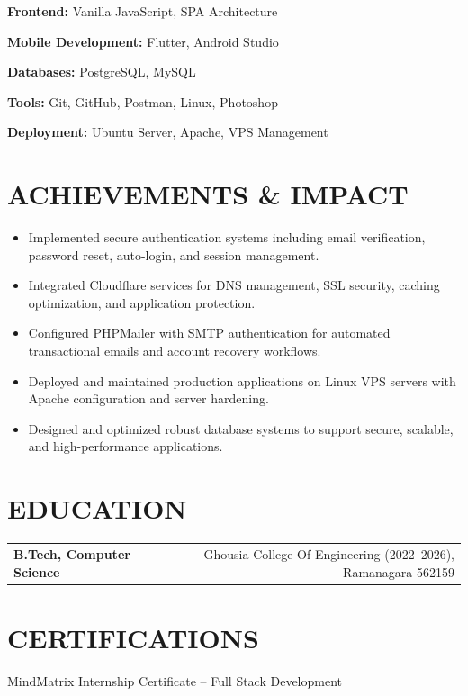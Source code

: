\documentclass[10pt,a4paper]{article}
\begin{document}
\textbf{Frontend:} Vanilla JavaScript, SPA Architecture

\textbf{Mobile Development:} Flutter, Android Studio

\textbf{Databases:} PostgreSQL, MySQL

\textbf{Tools:} Git, GitHub, Postman, Linux, Photoshop

\textbf{Deployment:} Ubuntu Server, Apache, VPS Management


\section*{ACHIEVEMENTS \& IMPACT}

\begin{itemize}
\item Implemented secure authentication systems including email verification, password reset, auto-login, and session management.
\item Integrated Cloudflare services for DNS management, SSL security, caching optimization, and application protection.
\item Configured PHPMailer with SMTP authentication for automated transactional emails and account recovery workflows.
\item Deployed and maintained production applications on Linux VPS servers with Apache configuration and server hardening.
\item Designed and optimized robust database systems to support secure, scalable, and high-performance applications.
\end{itemize}


\section*{EDUCATION}

\begin{tabularx}{\textwidth}{Xr}
\textbf{B.Tech, Computer Science}
&
Ghousia College Of Engineering (2022--2026), Ramanagara-562159
\end{tabularx}


\section*{CERTIFICATIONS}

MindMatrix Internship Certificate -- Full Stack Development
\end{document}

